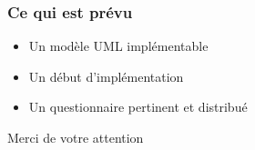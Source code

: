 \documentclass{beamer}
\begin{document}
  \begin{frame}
   \frametitle{Ce qui est prévu}
   \begin{itemize}
    \item Un modèle UML implémentable
    \item Un début d'implémentation
    \item Un questionnaire pertinent et distribué
   \end{itemize}
  \end{frame}

  \begin{frame}
    \begin{center}
      Merci de votre attention
    \end{center}
  \end{frame}
\end{document}
